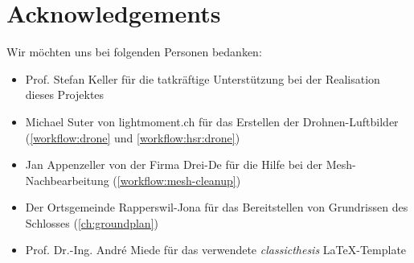 

\bigskip


\begingroup

\let\clearpage\relax
\let\cleardoublepage\relax
\let\cleardoublepage\relax

\chapter*{Acknowledgements} %

Wir möchten uns bei folgenden Personen bedanken:

\begin{itemize}
	\item Prof. Stefan Keller für die tatkräftige Unterstützung bei der
		Realisation dieses Projektes
	\item Michael Suter von lightmoment.ch für das Erstellen der
		Drohnen-Luftbilder (\autoref{workflow:drone} und
		\autoref{workflow:hsr:drone})
	\item Jan Appenzeller von der Firma Drei-De für die Hilfe bei der
		Mesh-Nachbearbeitung (\autoref{workflow:mesh-cleanup})
	\item Der Ortsgemeinde Rapperswil-Jona für das Bereitstellen von Grundrissen
		des Schlosses (\autoref{ch:groundplan})
	\item Prof. Dr.-Ing. André Miede für das verwendete \emph{classicthesis}
		\LaTeX-Template
\end{itemize}


\endgroup
